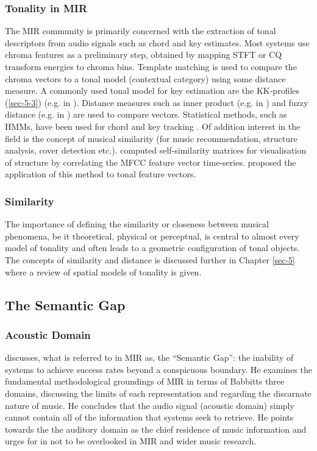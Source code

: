 \documentclass{article}
\begin{document}
\subsubsection{Tonality in MIR}
\label{sec-2-2-2}

The MIR community is primarily concerned with the extraction of tonal
descriptors from audio signals such as chord and key estimates. Most
systems use chroma features as a preliminary step, obtained by mapping
STFT or CQ transform energies to chroma bins. Template matching is
used to compare the chroma vectors to a tonal model (contextual
category) using some distance measure. A commonly used tonal model for
key estimation are the KK-profiles \citep{Krumhansl1990} (\ref{sec-5-3}) (e.g. in \citealt{Gomez2006}). Distance measures such as
inner product (e.g. in \citealt{Gomez2006}) and fuzzy distance
(e.g. in \citealt{Purwins2000}) are used to compare
vectors. Statistical methods, such as HMMs, have been used for chord
and key tracking \citep{Chai2005}. Of addition interest in the field
is the concept of musical similarity (for music recommendation,
structure analysis, cover detection etc.). \citet{Foote2000} computed
self-similarity matrices for visualisation of structure by correlating
the MFCC feature vector time-series. \citet{Gomez2006} proposed the
application of this method to tonal feature vectors.
\subsubsection{Similarity}
\label{sec-2-2-3}

The importance of defining the similarity or closeness between musical
phenomena, be it theoretical, physical or perceptual, is central to
almost every model of tonality and often leads to a geometric
configuration of tonal objects. The concepts of similarity and
distance is discussed further in Chapter \ref{sec-5}
where a review of spatial models of tonality is given.
\subsection{The Semantic Gap}
\label{sec-2-3}
\subsubsection{Acoustic Domain}
\label{sec-2-3-1}

\citet{Wiggins2009} discusses, what is referred to in MIR as, the
``Semantic Gap'': the inability of systems to achieve success rates
beyond a conspicuous boundary. He examines the fundamental
methodological groundings of MIR in terms of Babbitts three domains,
discussing the limits of each representation and regarding the
discarnate nature of music. He concludes that the audio signal
(acoustic domain) simply cannot contain all of the information that
systems seek to retrieve. He points towards the the auditory domain as
the chief residence of music information and urges for in not to be
overlooked in MIR and wider music research.
\end{document}
